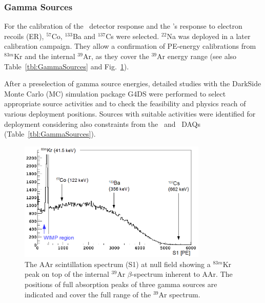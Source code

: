 \subsubsection{Gamma Sources}
For the calibration of the \lsv\ detector response and the \tpc's response to electron recoils (ER), $^{57}$Co, $^{133}$Ba and $^{137}$Cs were selected. $^{22}$Na was deployed in a later calibration campaign. They allow a confirmation of PE-energy calibrations from $^{83m}$Kr and the internal $^{39}$Ar, as they cover the $^{39}$Ar energy range (see also Table~\ref{tbl:GammaSources} and Fig.~\ref{fig:GammaSources_Ar39spectrum}). %

After a preselection of gamma source energies, detailed studies with the DarkSide Monte Carlo (MC) simulation package G4DS \cite{DS50:G4DS:paper} were performed to select appropriate source activities and to check the feasibility and physics reach of various deployment positions. Sources with suitable activities were identified for deployment considering also constraints from the \lsv\ and \tpc\ DAQs (Table~\ref{tbl:GammaSources}).

\begin{figure}[htbp]
 \centering
 \includegraphics[width=0.8\textwidth]{Figures/GammaSources_Ar39spectrum.png}
 \caption{The AAr scintillation spectrum (S1) at null field showing a $^{83m}$Kr peak on top of the internal $^{39}$Ar $\beta$-spectrum inherent to AAr. The positions of full absorption peaks of three gamma sources are indicated and cover the full range of the $^{39}$Ar spectrum.
\label{fig:GammaSources_Ar39spectrum}}
\end{figure}

